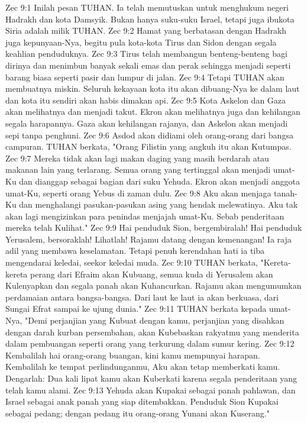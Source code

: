 Zec 9:1  Inilah pesan TUHAN. Ia telah memutuskan untuk menghukum negeri Hadrakh dan kota Damsyik. Bukan hanya suku-suku Israel, tetapi juga ibukota Siria adalah milik TUHAN.
Zec 9:2  Hamat yang berbatasan dengan Hadrakh juga kepunyaan-Nya, begitu pula kota-kota Tirus dan Sidon dengan segala keahlian penduduknya.
Zec 9:3  Tirus telah membangun benteng-benteng bagi dirinya dan menimbun banyak sekali emas dan perak sehingga menjadi seperti barang biasa seperti pasir dan lumpur di jalan.
Zec 9:4  Tetapi TUHAN akan membuatnya miskin. Seluruh kekayaan kota itu akan dibuang-Nya ke dalam laut dan kota itu sendiri akan habis dimakan api.
Zec 9:5  Kota Askelon dan Gaza akan melihatnya dan menjadi takut. Ekron akan melihatnya juga dan kehilangan segala harapannya. Gaza akan kehilangan rajanya, dan Askelon akan menjadi sepi tanpa penghuni.
Zec 9:6  Asdod akan didiami oleh orang-orang dari bangsa campuran. TUHAN berkata, "Orang Filistin yang angkuh itu akan Kutumpas.
Zec 9:7  Mereka tidak akan lagi makan daging yang masih berdarah atau makanan lain yang terlarang. Semua orang yang tertinggal akan menjadi umat-Ku dan dianggap sebagai bagian dari suku Yehuda. Ekron akan menjadi anggota umat-Ku, seperti orang Yebus di zaman dulu.
Zec 9:8  Aku akan menjaga tanah-Ku dan menghalangi pasukan-pasukan asing yang hendak melewatinya. Aku tak akan lagi mengizinkan para penindas menjajah umat-Ku. Sebab penderitaan mereka telah Kulihat."
Zec 9:9  Hai penduduk Sion, bergembiralah! Hai penduduk Yerusalem, bersoraklah! Lihatlah! Rajamu datang dengan kemenangan! Ia raja adil yang membawa keselamatan. Tetapi penuh kerendahan hati ia tiba mengendarai keledai, seekor keledai muda.
Zec 9:10  TUHAN berkata, "Kereta-kereta perang dari Efraim akan Kubuang, semua kuda di Yerusalem akan Kulenyapkan dan segala panah akan Kuhancurkan. Rajamu akan mengumumkan perdamaian antara bangsa-bangsa. Dari laut ke laut ia akan berkuasa, dari Sungai Efrat sampai ke ujung dunia."
Zec 9:11  TUHAN berkata kepada umat-Nya, "Demi perjanjian yang Kubuat dengan kamu, perjanjian yang disahkan dengan darah kurban persembahan, akan Kubebaskan rakyatmu yang menderita dalam pembuangan seperti orang yang terkurung dalam sumur kering.
Zec 9:12  Kembalilah hai orang-orang buangan, kini kamu mempunyai harapan. Kembalilah ke tempat perlindunganmu, Aku akan tetap memberkati kamu. Dengarlah: Dua kali lipat kamu akan Kuberkati karena segala penderitaan yang telah kamu alami.
Zec 9:13  Yehuda akan Kupakai sebagai panah pahlawan, dan Israel sebagai anak panah yang siap ditembakkan. Penduduk Sion Kupakai sebagai pedang; dengan pedang itu orang-orang Yunani akan Kuserang."
